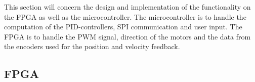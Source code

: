 \documentclass[../../main.tex]{subfiles}
\begin{document}
This section will concern the design and implementation of the functionality on the FPGA as well as the microcontroller. The microcontroller is to handle the computation of the PID-controllers, SPI communication and user input. The FPGA is to handle the PWM signal, direction of the motors and the data from the encoders used for the position and velocity feedback. 



\subsection{FPGA} \label{subsec:SystemImplemtationFPGA}



\end{document}
